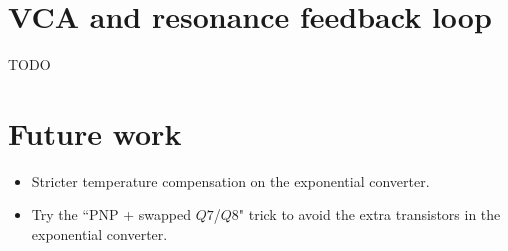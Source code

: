 \documentclass[a4paper,11pt]{article}
\begin{document}
\section{VCA and resonance feedback loop}
\label{sec:vca}

TODO

\section{Future work}

\begin{itemize}
\item Stricter temperature compensation on the exponential converter.
\item Try the ``PNP + swapped $Q7$/$Q8$" trick to avoid the extra transistors in the exponential converter.
\end{itemize}
\end{document}
